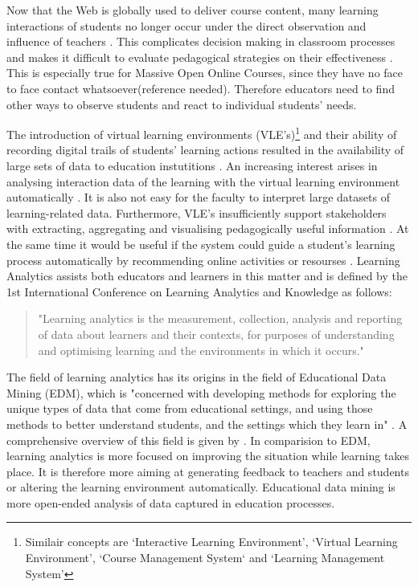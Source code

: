 \documentclass[11pt]{article}
\begin{document}
Now that the Web is globally used to deliver course content, many learning interactions of students no longer occur under the direct observation and influence of teachers \cite{Sheard2003}. This complicates decision making in classroom processes and makes it difficult to evaluate pedagogical strategies on their effectiveness \cite{Romero2007}. This is especially true for Massive Open Online Courses, since they have no face to face contact whatsoever(reference needed). Therefore educators need to find other ways to observe students and react to individual students' needs.

The introduction of virtual learning environments (VLE's)\footnote{Similair concepts are `Interactive Learning Environment', `Virtual Learning Environment', `Course Management System` and `Learning Management System'} and their ability of recording digital trails of students' learning actions resulted in the availability of large sets of data to education instutitions \cite{Ferguson2012a}\cite{Romero2007}. An increasing interest arises in analysing interaction data of the learning with the virtual learning environment automatically \cite{Muehlenbrock2005}. It is also not easy for the faculty to interpret large datasets of learning-related data. Furthermore, VLE's insufficiently support stakeholders with extracting, aggregating and visualising pedagogically useful information \cite{Zhang2007}\cite{Dawson2010}\cite{Zaiane2001}. At the same time it would be useful if the system could guide a student's learning process automatically by recommending online activities or resourses \cite{Zaiane2001}.
Learning Analytics assists both educators and learners in this matter and is defined by the 1st International Conference on Learning Analytics and Knowledge as follows:
\begin{quote}
"Learning analytics is the measurement, collection, analysis and reporting of data about learners and their contexts, for purposes of understanding and optimising learning and the environments in which it occurs." \cite{lak2011}
\end{quote}

The field of learning analytics has its origins in the field of Educational Data Mining (EDM), which is "concerned with developing methods for exploring the unique types of data that come from educational settings, and using those methods to better understand students, and the settings which they learn in" \cite{Baker2009}. A comprehensive overview of this field is given by \cite{Romero2007}. In comparision to EDM, learning analytics is more focused on improving the situation while learning takes place. It is therefore more aiming at generating feedback to teachers and students or altering the learning environment automatically. Educational data mining is more open-ended analysis of data captured in education processes. 
\end{document}
